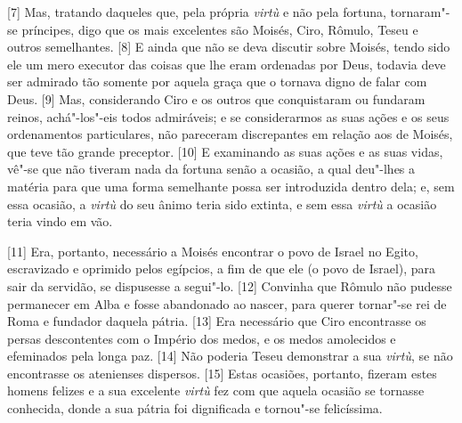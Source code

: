 {[}7{]} Mas, tratando daqueles que, pela própria \emph{virtù} e não pela
fortuna, tornaram"-se príncipes, digo que os mais excelentes são Moisés,
Ciro, Rômulo, Teseu e outros semelhantes. {[}8{]} E ainda que não se deva
discutir sobre Moisés, tendo sido ele um mero executor das coisas que
lhe eram ordenadas por Deus, todavia deve ser admirado tão somente por
aquela graça que o tornava digno de falar com Deus. {[}9{]} Mas,
considerando Ciro e os outros que conquistaram ou fundaram reinos,
achá"-los"-eis todos admiráveis; e se considerarmos as suas ações e os
seus ordenamentos particulares, não pareceram discrepantes em relação
aos de Moisés, que teve tão grande preceptor. {[}10{]} E examinando as suas ações e as suas vidas,
vê"-se que não tiveram nada da fortuna senão a ocasião, a qual deu"-lhes a
matéria para que uma forma semelhante possa ser introduzida dentro
dela; e, sem essa ocasião, a
\emph{virtù} do seu ânimo teria sido extinta, e sem essa \emph{virtù} a
ocasião teria vindo em vão.

{[}11{]} Era, portanto, necessário a Moisés encontrar o povo de Israel
no Egito, escravizado e oprimido pelos egípcios, a fim de que ele (o
povo de Israel), para sair da servidão, se dispusesse a segui"-lo.
{[}12{]} Convinha que Rômulo não pudesse permanecer em Alba e fosse
abandonado ao nascer, para querer tornar"-se rei de Roma e fundador
daquela pátria. {[}13{]} Era necessário que Ciro encontrasse os persas
descontentes com o Império dos medos, e os medos amolecidos e efeminados
pela longa paz. {[}14{]} Não poderia Teseu demonstrar a sua
\emph{virtù}, se não encontrasse os atenienses dispersos. {[}15{]} Estas
ocasiões, portanto, fizeram estes homens felizes e a sua excelente
\emph{virtù} fez com que aquela ocasião se tornasse conhecida, donde a
sua pátria foi dignificada e tornou"-se felicíssima.

